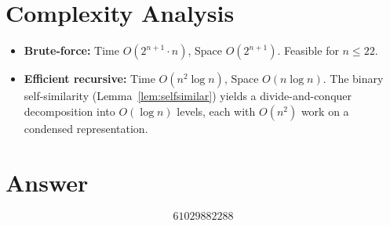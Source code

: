 \documentclass[11pt,a4paper]{article}
\begin{document}
\section{Complexity Analysis}

\begin{itemize}[nosep]
\item \textbf{Brute-force:} Time $O(2^{n+1} \cdot n)$, Space $O(2^{n+1})$. Feasible for $n \le 22$.
\item \textbf{Efficient recursive:} Time $O(n^2 \log n)$, Space $O(n \log n)$. The binary self-similarity (Lemma~\ref{lem:selfsimilar}) yields a divide-and-conquer decomposition into $O(\log n)$ levels, each with $O(n^2)$ work on a condensed representation.
\end{itemize}

\section{Answer}

\[
\boxed{61029882288}
\]
\end{document}
